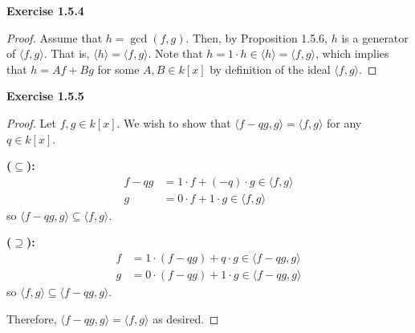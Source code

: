 \documentclass[12pt,oneside]{article}
\newenvironment{exercise}[1]{\vspace{.1in}\noindent\textbf{Exercise #1 \hspace{.05em}}}{}
\begin{document}

\begin{exercise}{1.5.4}
    \begin{proof}
        Assume that $h = \gcd(f,g)$. Then, by Proposition 1.5.6, $h$ is a
        generator of $\langle f,g \rangle$. That is, $\langle h \rangle = \langle f,g \rangle$.
        Note that $h = 1 \cdot h \in \langle h \rangle = \langle f,g \rangle$, which 
        implies that $h = Af + Bg$ for some $A,B \in k[x]$ by definition of the ideal
        $\langle f,g \rangle$. 
    \end{proof}
\end{exercise}


\begin{exercise}{1.5.5}
    \begin{proof}
        Let $f,g \in k[x]$. We wish to show that $\langle f-qg,g \rangle = \langle f,g \rangle$
        for any $q \in k[x]$.

        \bigskip
        \textbf{($\subseteq$):} 
        \begin{align*}
            f-qg    &= 1 \cdot f + (-q) \cdot g \in \langle f,g \rangle\\
            g       &= 0 \cdot f + 1 \cdot g \in \langle f,g \rangle    
        \end{align*}
        so $\langle f-qg,g \rangle \subseteq \langle f,g \rangle$.

        \bigskip
        \textbf{($\supseteq$):} 
        \begin{align*}
            f   &= 1 \cdot (f-qg) + q \cdot g \in \langle f-qg, g \rangle\\
            g   &= 0 \cdot (f-qg) + 1 \cdot g \in \langle f-qg, g \rangle
        \end{align*}
        so $\langle f,g \rangle \subseteq \langle f-qg, g \rangle$.

        Therefore, $\langle f-qg,g \rangle = \langle f,g \rangle$ as desired.
    \end{proof}
\end{exercise}

\end{document}
